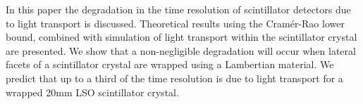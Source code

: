 In this paper the degradation in the time resolution of scintillator detectors due to light transport is discussed. Theoretical results using the Cram\'{e}r-Rao lower bound, combined with simulation of light transport within the scintillator crystal are presented. We show that a non-negligible degradation will occur when lateral facets of a scintillator crystal are wrapped using a Lambertian material. We predict that up to a third of the time resolution is due to light transport for a wrapped 20mm LSO scintillator crystal.
